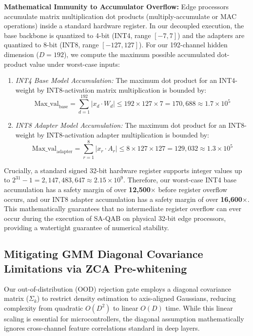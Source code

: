 \documentclass{article}
\theoremstyle{plain}
\theoremstyle{definition}
\theoremstyle{remark}
\begin{document}
\textbf{Mathematical Immunity to Accumulator Overflow:} Edge processors accumulate matrix multiplication dot products (multiply-accumulate or MAC operations) inside a standard hardware register. In our decoupled execution, the base backbone is quantized to 4-bit (INT4, range $[-7, 7]$) and the adapters are quantized to 8-bit (INT8, range $[-127, 127]$). For our 192-channel hidden dimension ($D=192$), we compute the maximum possible accumulated dot-product value under worst-case inputs:
\begin{enumerate}
    \item \emph{INT4 Base Model Accumulation:} The maximum dot product for an INT4-weight by INT8-activation matrix multiplication is bounded by:
    \begin{equation}
        \text{Max\_val}_{\text{base}} = \sum_{d=1}^{192} |x_d \cdot W_d| \le 192 \times 127 \times 7 = 170,688 \approx 1.7 \times 10^5
    \end{equation}
    \item \emph{INT8 Adapter Model Accumulation:} The maximum dot product for an INT8-weight by INT8-activation adapter multiplication is bounded by:
    \begin{equation}
        \text{Max\_val}_{\text{adapter}} = \sum_{r=1}^{8} |x_r \cdot A_r| \le 8 \times 127 \times 127 = 129,032 \approx 1.3 \times 10^5
    \end{equation}
\end{enumerate}
Crucially, a standard signed 32-bit hardware register supports integer values up to $2^{31}-1 = 2,147,483,647 \approx 2.15 \times 10^9$. Therefore, our worst-case INT4 base accumulation has a safety margin of over \textbf{12,500$\times$} before register overflow occurs, and our INT8 adapter accumulation has a safety margin of over \textbf{16,600$\times$}. This mathematically guarantees that no intermediate register overflow can ever occur during the execution of SA-QAB on physical 32-bit edge processors, providing a watertight guarantee of numerical stability.

\subsection{Mitigating GMM Diagonal Covariance Limitations via ZCA Pre-whitening}
\label{sec:appendix_whitening}
Our out-of-distribution (OOD) rejection gate employs a diagonal covariance matrix ($\Sigma_k$) to restrict density estimation to axis-aligned Gaussians, reducing complexity from quadratic $O(D^2)$ to linear $O(D)$ time. While this linear scaling is essential for microcontrollers, the diagonal assumption mathematically ignores cross-channel feature correlations standard in deep layers.
\end{document}
